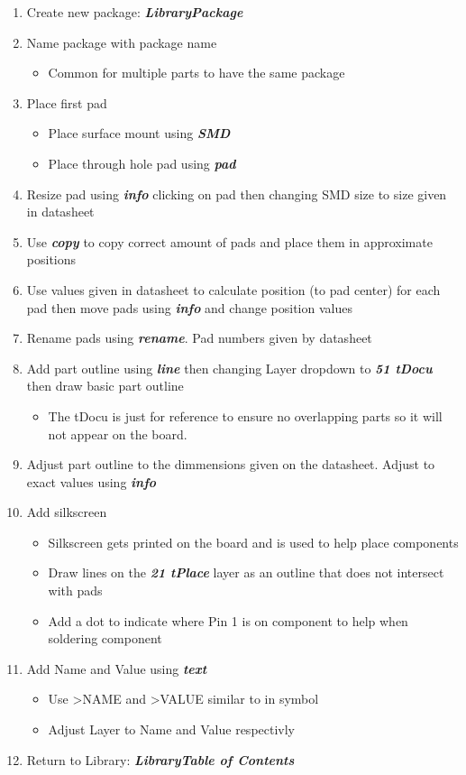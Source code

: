 \documentclass{article}
\begin{document}
\begin{enumerate}
    \item Create new package: \textit{\textbf{Library\textrightarrow Package}}
    \item Name package with package name
    \begin{itemize}
        \item Common for multiple parts to have the same package
    \end{itemize}
    \item Place first pad
    \begin{itemize}
        \item Place surface mount using \textit{\textbf{SMD}}
        \item Place through hole pad using \textit{\textbf{pad}}
    \end{itemize}
    \item Resize pad using \textit{\textbf{info}} clicking on pad then changing SMD size to size given in datasheet
    \item Use \textit{\textbf{copy}} to copy correct amount of pads and place them in approximate positions
    \item Use values given in datasheet to calculate position (to pad center) for each pad then move pads using \textit{\textbf{info}} and change position values
    \item Rename pads using \textit{\textbf{rename}}. Pad numbers given by datasheet
    \item Add part outline using \textit{\textbf{line}} then changing Layer dropdown to \textit{\textbf{51 tDocu}} then draw basic part outline
    \begin{itemize}
        \item The tDocu is just for reference to ensure no overlapping parts so it will not appear on the board.
    \end{itemize}
    \item Adjust part outline to the dimmensions given on the datasheet. Adjust to exact values using \textit{\textbf{info}}
    \item Add silkscreen
    \begin{itemize}
        \item Silkscreen gets printed on the board and is used to help place components
        \item Draw lines on the \textit{\textbf{21 tPlace}} layer as an outline that does not intersect with pads
        \item Add a dot to indicate where Pin 1 is on component to help when soldering component
    \end{itemize}
    \item Add Name and Value using \textit{\textbf{text}}
    \begin{itemize}
        \item Use \textgreater NAME and  \textgreater VALUE similar to in symbol
        \item Adjust Layer to Name and Value respectivly
    \end{itemize}
    \item Return to Library: \textit{\textbf{Library\textrightarrow Table
    of Contents}}
\end{enumerate}
\end{document}
